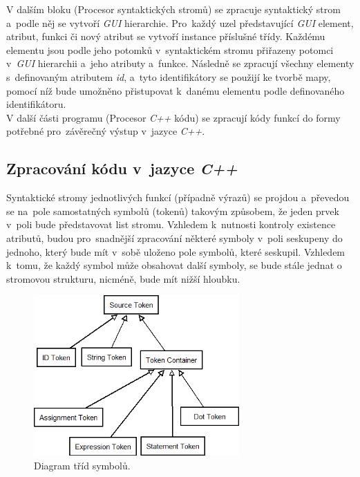 \documentclass[11pt,twoside,a4paper]{book}
\begin{document}
V dalším bloku (Procesor syntaktických stromů) se zpracuje syntaktický strom a~podle něj se vytvoří \textit{GUI} hierarchie. Pro~každý uzel představující \textit{GUI} element, atribut, funkci či nový atribut se vytvoří instance příslušné třídy. Každému elementu jsou podle jeho potomků v~syntaktickém stromu přiřazeny potomci v~\textit{GUI} hierarchii a~jeho atributy a~funkce.
Následně se zpracují všechny elementy s~definovaným atributem \textit{id}, a~tyto identifikátory se použijí ke tvorbě mapy, pomocí níž bude umožněno přistupovat k~danému elementu podle definovaného identifikátoru.\\
V další části programu (Procesor \textit{C++} kódu) se zpracují kódy funkcí do formy potřebné pro~závěrečný výstup v~jazyce \textit{C++}.

\subsection{\label{SEC:tokens}Zpracování kódu v~jazyce \textit{C++}}
Syntaktické stromy jednotlivých funkcí (případně výrazů) se projdou a~převedou se na~pole samostatných symbolů (tokenů) takovým způsobem, že jeden prvek v~poli bude představovat list stromu. Vzhledem k~nutnosti kontroly existence atributů, budou pro~snadnější zpracování některé symboly v~poli seskupeny do jednoho, který bude mít v~sobě uloženo pole symbolů, které seskupil. Vzhledem k~tomu, že každý symbol může obsahovat další symboly, se bude stále jednat o stromovou strukturu, nicméně, bude mít nižší hloubku.\\
\begin{figure}[!ht]
\begin{center}
  \includegraphics[width=0.7\textwidth]{tokens}
\caption{{\label{fig:fig2}}Diagram tříd symbolů.}
\end{center}
\end{figure}
\end{document}
